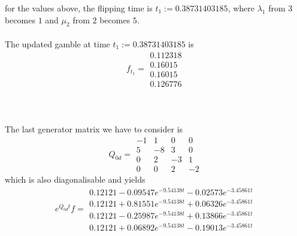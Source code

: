 \documentclass{article}
\begin{document}
for the values above, the flipping time is $t_{1}:= 0.38731403185$, where $\lambda_{1}$ from $3$ becomes $1$ and $\mu_{2}$ from $2$ becomes $5$.\\\\
The updated gamble at time $t_{1}:= 0.38731403185$ is
\begin{equation*} 
 f_{t_1}= 
 \begin{array}{|c|}
  0.112318\\
  0.16015\\
  0.16015\\
  0.126776  
 \end{array}
 \end{equation*}\\\\\\
 The last generator matrix we have to consider is
\begin{equation*} 
 Q_{0d}= 
 \begin{array}{|rrrr|}
  -1 & 1 & 0 & 0 \\
  5 & -8 & 3 & 0 \\
  0 & 2 & -3 & 1 \\
  0 & 0 & 2 & -2 
 \end{array}
 \end{equation*}
 which is also diagonalisable and yields
\begin{equation*} 
 e^{Q_{0d}t}f= 
 \begin{array}{|r|}
 0.12121-0.09547e^{-9.54138t}- 0.02573e^{-3.45861t}\\
  0.12121+0.81551e^{-9.54138t}+ 0.06326e^{-3.45861t}\\
  0.12121-0.25987e^{-9.54138t}+ 0.13866e^{-3.45861t}\\
  0.12121+0.06892e^{-9.54138t}- 0.19013e^{-3.45861t}
 \end{array}
 \end{equation*}
\end{document}
